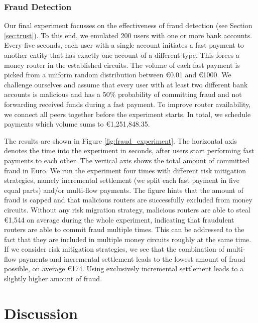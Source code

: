 \subsubsection*{Fraud Detection}
\label{sec:fraud_experiment}
Our final experiment focusses on the effectiveness of fraud detection (see Section \ref{sec:trust}). %
To this end, we emulated 200 users with one or more bank accounts.
Every five seconds, each user with a single account initiates a fast payment to another entity that has exactly one account of a different type.
This forces a money router in the established circuits.
The volume of each fast payment is picked from a uniform random distribution between \euro 0.01 and \euro 1000.
We challenge ourselves and assume that every user with at least two different bank accounts is malicious and has a 50\% probability of committing fraud and not forwarding received funds during a fast payment.
To improve router availability, we connect all peers together before the experiment starts.
In total, we schedule payments which volume sums to \euro 1,251,848.35.

The results are shown in Figure \ref{fig:fraud_experiment}.
The horizontal axis denotes the time into the experiment in seconds, after users start performing fast payments to each other.
The vertical axis shows the total amount of committed fraud in Euro.
We run the experiment four times with different risk mitigation strategies, namely incremental settlement (we split each fast payment in five equal parts) and/or multi-flow payments.
The figure hints that the amount of fraud is capped and that malicious routers are successfully excluded from money circuits.
Without any risk migration strategy, malicious routers are able to steal \euro 1,544 on average during the whole experiment, indicating that fraudulent routers are able to commit fraud multiple times.
This can be addressed to the fact that they are included in multiple money circuits roughly at the same time. 
If we consider risk mitigation strategies, we see that the combination of multi-flow payments and incremental settlement leads to the lowest amount of fraud possible, on average \euro 174.
Using exclusively incremental settlement leads to a slightly higher amount of fraud.

\section{Discussion}
\label{sec:discussion}

